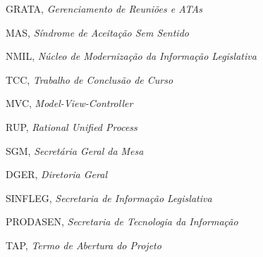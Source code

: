 \begin{siglas}
	\item GRATA, \textit{Gerenciamento de Reuniões e ATAs}
  	\item MAS, \textit{Síndrome de Aceitação Sem Sentido}
  	\item NMIL, \textit{Núcleo de Modernização da Informação Legislativa}
  	\item TCC, \textit{Trabalho de Conclusão de Curso}
  	\item MVC, \textit{Model-View-Controller}
  	\item RUP, \textit{Rational Unified Process}
  	\item SGM, \textit{Secretária Geral da Mesa}
  	\item DGER, \textit{Diretoria Geral}
  	\item SINFLEG, \textit{Secretaria de Informação Legislativa}
  	\item PRODASEN, \textit{Secretaria de Tecnologia da Informação}
  	\item TAP, \textit{Termo de Abertura do Projeto}
\end{siglas}